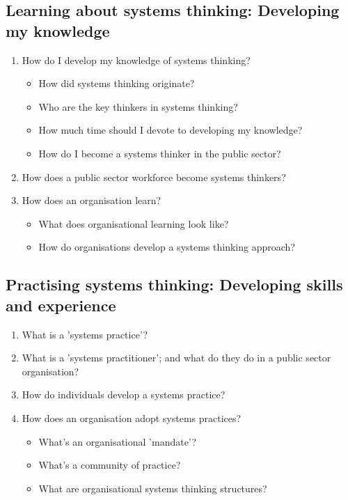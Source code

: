 \subsection*{Learning about systems thinking: Developing my knowledge}
\begin{enumerate}
	\item How do I develop my knowledge of systems thinking?
	\begin{itemize}
		\item How did systems thinking originate? 
		\item Who are the key thinkers in systems thinking?
		\item How much time should I devote to developing my knowledge?	
		\item How do I become a systems thinker in the public sector?
	\end{itemize}	
	\item How does a public sector workforce become systems thinkers?	
	\item How does an organisation learn?
	\begin{itemize}
		\item What does organisational learning look like?
		\item How do organisations develop a systems thinking approach?
	\end{itemize}


\end{enumerate}

\subsection*{Practising systems thinking: Developing skills and experience}
\begin{enumerate}
	\item What is a 'systems practice'?
	\item What is a 'systems practitioner'; and what do they do in a public sector organisation?
	\item How do individuals develop a systems practice?
	\item How does an organisation adopt systems practices?
	\begin{itemize}
		\item What's an organisational 'mandate'?
		\item What's a community of practice?
		\item What are organisational systems thinking structures?
	\end{itemize}
	
\end{enumerate}


